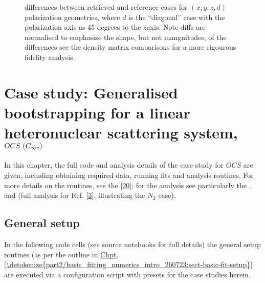 \documentclass[letterpaper,table,10pt,english]{jupyterBook}
\begin{document}
\begin{figure}[htbp]
\centering
\capstart

\noindent{}
\caption{{\hyperref[\detokenize{backmatter/glossary:term-MF}]{}} differences between retrieved and reference cases for \((x,y,z,d)\) polarization geometries, where \(d\) is the “diagonal” case with the polarization axis as 45 degrees to the \(z\)\sphinxhyphen{}axis. Note diffs are normalised to emphasize the shape, but not mangnitudes, of the differences \sphinxhyphen{} see the density matrix comparisons for a more rigourous fidelity analysis.}\label{\detokenize{part2/case-study-N2_290723:fig-n2-diff}}\end{figure}

\sphinxstepscope


\chapter{Case study: Generalised bootstrapping for a linear heteronuclear scattering system, \protect\(OCS~(C_{\infty v})\protect\)}
\label{\detokenize{part2/case-study-OCS_290723:case-study-generalised-bootstrapping-for-a-linear-heteronuclear-scattering-system-ocs-c-infty-v}}\label{\detokenize{part2/case-study-OCS_290723:chpt-ocs-case-study}}\label{\detokenize{part2/case-study-OCS_290723::doc}}
\sphinxAtStartPar
In this chapter, the full code and analysis details of the case study for \(OCS\) are given, including obtaining required data, running fits and analysis routines. For more details on the routines, see the  {[}\hyperlink{cite.backmatter/bibliography:id681}{20}{]}; for the analysis see particularly the , and  (full analysis for Ref. {[}\hyperlink{cite.backmatter/bibliography:id686}{3}{]}, illustrating the \(N_2\) case).


\section{General setup}
\label{\detokenize{part2/case-study-OCS_290723:general-setup}}
\sphinxAtStartPar
In the following code cells (see source notebooks for full details) the general setup routines (as per the outline in \hyperref[\detokenize{part2/basic_fitting_numerics_intro_260723:sect-basic-fit-setup}]{Chpt.\@ \ref{\detokenize{part2/basic_fitting_numerics_intro_260723:sect-basic-fit-setup}}} are executed via a configuration script with presets for the case studies herein.
\end{document}
